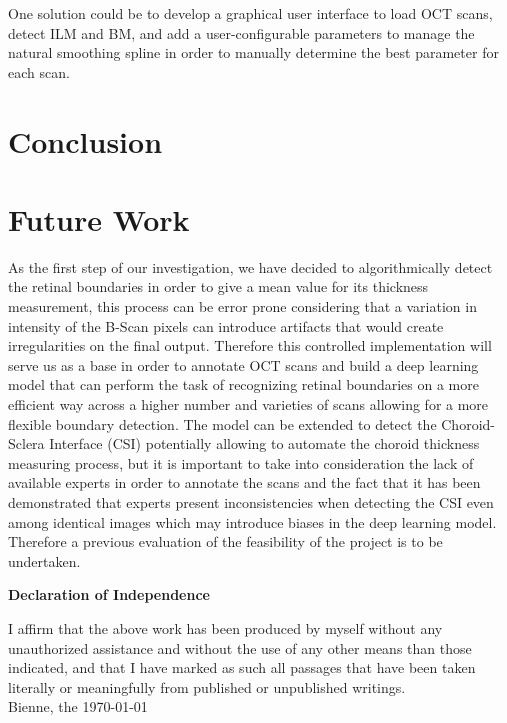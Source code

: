\documentclass[12pt,a4paper]{scrartcl}
\begin{document}
One solution could be to develop a graphical user interface to load OCT scans, detect ILM and BM, and add a user-configurable parameters to manage the natural smoothing spline in order to manually determine the best parameter for each scan.


\section{Conclusion}
\section{Future Work}
As the first step of our investigation, we have decided to algorithmically detect the retinal boundaries in order to give a mean value for its thickness measurement, this process can be error prone considering that a variation in intensity of the B-Scan pixels can introduce artifacts that would create irregularities on the final output. Therefore this controlled implementation will serve us as a base in order to annotate OCT scans and build a deep learning model that can perform the task of recognizing retinal boundaries on a more efficient way across a higher number and varieties of scans allowing for a more flexible boundary detection. The model can be extended to detect the Choroid-Sclera Interface (CSI) potentially allowing to automate the choroid thickness measuring process, but it is important to take into consideration the lack of available experts in order to annotate the scans and the fact that it has been demonstrated that experts present inconsistencies when detecting the CSI even among identical images \cite{Ronchetti2019statistic} which may introduce biases in the deep learning model. Therefore a previous evaluation of the feasibility of the project is to be undertaken.   

\markboth{}{}

\newpage





\newpage
\thispagestyle{empty}
\markboth{}{}
  \normalsize
\begin{center}
\huge{\textbf{ Declaration of Independence}}\\[40mm]
\end{center}
\large
I affirm that the above work has been produced by myself without any unauthorized assistance and without the use of any other means than those indicated, and that I have marked as such all passages that have been taken literally or meaningfully from published or unpublished writings.\\[50mm]
Bienne, the \today

\newpage
\end{document}
